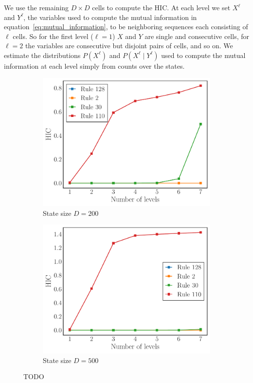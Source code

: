 We use the remaining $D \times D$ cells to compute the HIC. At each level we
set $X^\ell$ and $Y^\ell$, the variables used to compute the mutual information
in equation~\ref{eq:mutual_information}, to be neighboring sequences each
consisting of $\ell$ cells. So for the first level ($\ell = 1$) $X$ and $Y$ are
single and consecutive cells, for $\ell = 2$ the variables are consecutive but
disjoint pairs of cells, and so on. We estimate the distributions $P(X^\ell)$
and $P(X^\ell \mid Y^\ell)$ used to compute the mutual information at each
level simply from counts over the states.

\begin{figure}[t]
\centering
\begin{subfigure}{0.45\textwidth}
  \includegraphics[width=1.0\textwidth]{figures/hic_vs_num_levels_size_200}
  \caption{State size $D = 200$}
  \label{fig:hic_levels_200}
\end{subfigure}
\begin{subfigure}{0.45\textwidth}
  \includegraphics[width=1.0\textwidth]{figures/hic_vs_num_levels_size_500}
  \caption{State size $D = 500$}
  \label{fig:hic_levels_500}
\end{subfigure}
\caption{TODO}
\label{fig:hic_vs_levels}
\end{figure}

